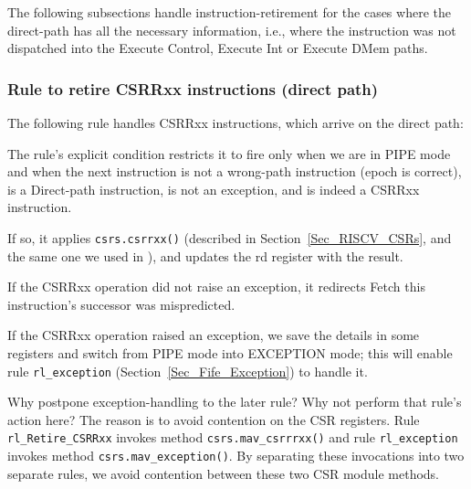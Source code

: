 The following subsections handle instruction-retirement for the cases
where the direct-path has all the necessary information, i.e., where
the instruction was not dispatched into the Execute Control, Execute
Int or Execute DMem paths.


\subsubsection{Rule to retire CSRRxx instructions (direct path)}

\label{Sec_Fife_Retire_CSRRxx}

The following rule handles CSRRxx instructions, which arrive on the direct path:


The rule's explicit condition restricts it to fire only when we are in
PIPE mode and when the next instruction is not a wrong-path
instruction (epoch is correct), is a Direct-path instruction, is not
an exception, and is indeed a CSRRxx instruction.

If so, it applies \verb|csrs.csrrxx()| (described in
Section~\ref{Sec_RISCV_CSRs}, and the same one we used in {\DRUM}), and
updates the rd register with the result.

If the CSRRxx operation did not raise an exception, it redirects Fetch
this instruction's successor was mispredicted.

If the CSRRxx operation raised an exception, we save the details in
some registers and switch from PIPE mode into EXCEPTION mode; this
will enable rule \verb|rl_exception|
(Section~\ref{Sec_Fife_Exception}) to handle it.

Why postpone exception-handling to the later rule?  Why not perform
that rule's action here?  The reason is to avoid contention on the CSR
registers.  Rule \verb|rl_Retire_CSRRxx| invokes method
\verb|csrs.mav_csrrrxx()| and rule \verb|rl_exception| invokes method
\verb|csrs.mav_exception()|.  By separating these invocations into two
separate rules, we avoid contention between these two CSR module
methods.





